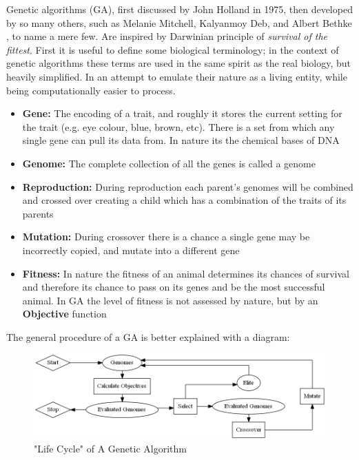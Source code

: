 \documentclass[11pt]{article}
\begin{document}
    Genetic algorithms (GA), first 
    discussed by John Holland \cite{Holland} in 1975, then developed by so many
    others, such as Melanie Mitchell, Kalyanmoy Deb, and Albert Bethke
    \cite{Mitchell, KalyanmoyDeb, Bethke}, to name a mere few. Are inspired by Darwinian
    principle of \textit{survival of the fittest}.
    First it is useful to define some biological terminology; in the context of
    genetic algorithms these terms are used in the same spirit as the real biology,
    but heavily simplified. In an attempt to emulate their nature as a living entity,
    while being computationally easier to process.

    \begin{itemize}
        \item{\textbf{Gene:} The encoding of a trait, and roughly it stores the current
            setting for the trait (e.g. eye colour, blue, brown, etc). There is a set
            from which any single gene can pull its data from. In nature its the chemical
            bases  of DNA}
        \item{\textbf{Genome:} The complete collection of all the genes is called a
            genome}
        \item{\textbf{Reproduction:} During reproduction each parent's genomes will be
            combined and crossed over creating a child which has a combination of
            the traits of its parents}
        \item{\textbf{Mutation:} During crossover there is a chance a single gene
            may be incorrectly copied, and mutate into a different gene}
        \item{\textbf{Fitness: } In nature the fitness of an animal determines
            its chances of survival and therefore its chance to pass on its genes
            and be the most successful animal. In GA the level of fitness is not assessed
            by nature, but by an \textbf{Objective} function}
    \end{itemize}

    The general procedure of a GA is better explained with a diagram:

    \begin{figure}[H] %
        \centering
        \includegraphics[width=\textwidth]{GA}
        \caption{"Life Cycle" of A Genetic Algorithm}\label{fig:GA}
    \end{figure}
\end{document}
